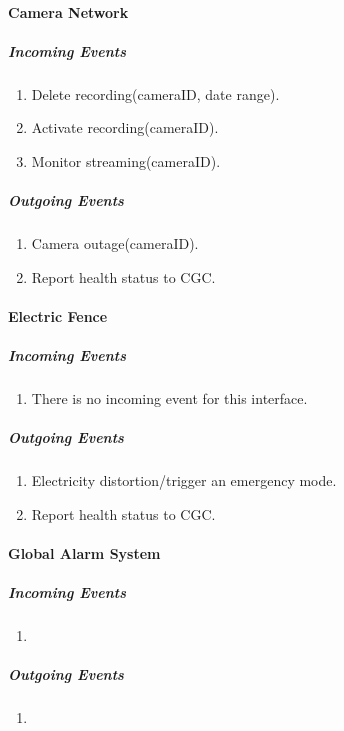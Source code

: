 \documentclass[12pt]{article}
\begin{document}
		\paragraph{Camera Network}
		\textit{}
			\subparagraph{Incoming Events}
				\begin{enumerate}
					\item Delete recording(cameraID, date range).
                    \item Activate recording(cameraID). 
                    \item Monitor streaming(cameraID).
				\end{enumerate}
				
			\subparagraph{Outgoing Events}
				\begin{enumerate}
                   \item Camera outage(cameraID).
                    \item Report health status to CGC. 
				\end{enumerate}

		\paragraph{Electric Fence}
		\textit{}
			\subparagraph{Incoming Events}
				\begin{enumerate}
                    \item There is no incoming event for this interface.
				\end{enumerate}
				
			\subparagraph{Outgoing Events}
				\begin{enumerate}
					\item Electricity distortion/trigger an emergency mode. 
                    \item Report health status to CGC. 
				\end{enumerate}

		\paragraph{Global Alarm System}
		\textit{}
			\subparagraph{Incoming Events}
				\begin{enumerate}
					\item 
				\end{enumerate}
				
			\subparagraph{Outgoing Events}
				\begin{enumerate}
					\item 
				\end{enumerate}
\end{document}

